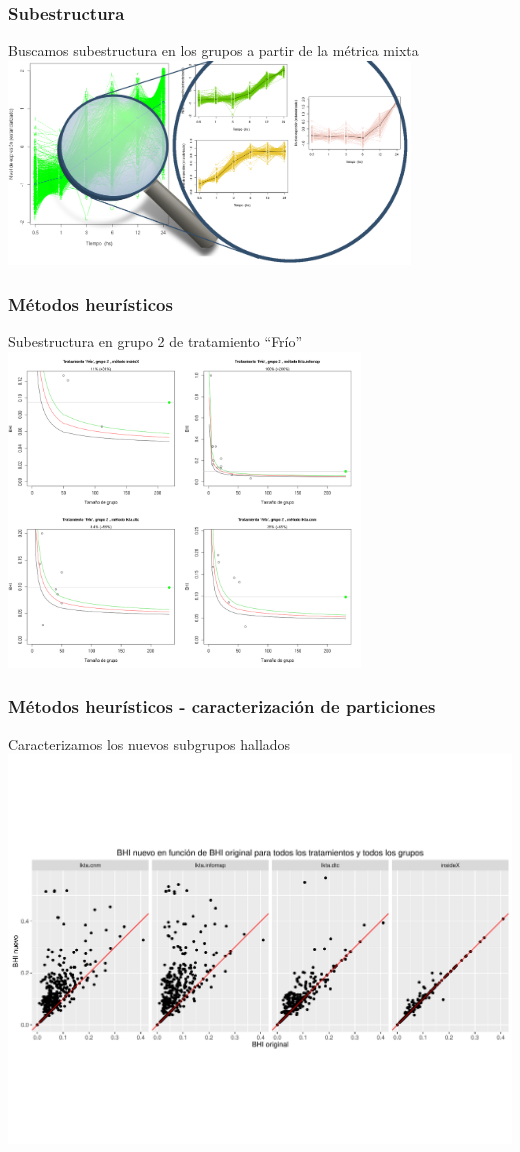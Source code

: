 \documentclass[serif,9pt, t]{beamer}
\begin{document}
\begin{frame}\frametitle{Subestructura} 
\centering
Buscamos subestructura en los grupos a partir de la métrica mixta\\
\bigskip
\bigskip
\bigskip
\includegraphics[width=0.8\textwidth]{lupa.png}
\end{frame}

\begin{frame}\frametitle{Métodos heurísticos} 
\centering
Subestructura en grupo 2 de tratamiento ``Frío''
\includegraphics[width=0.7\textwidth]{metodos_mixtos_grupo_2.png}
\end{frame}

\begin{frame}\frametitle{Métodos heurísticos - caracterización de particiones} 
\centering
Caracterizamos los nuevos subgrupos hallados
\centering
\includegraphics[width=1\textwidth]{bhi_nuevo_vs_bhi_original.pdf}
\end{frame}
\end{document}

